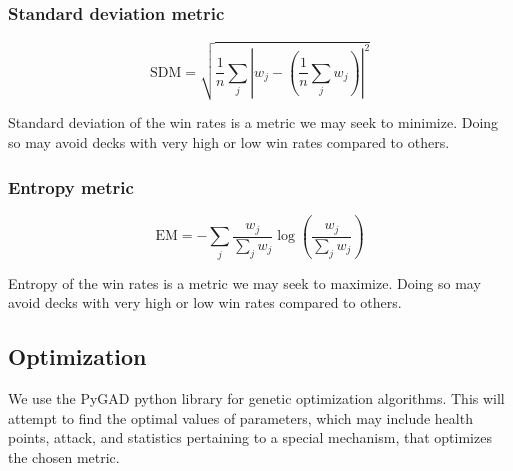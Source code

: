 


\subsubsection{Standard deviation metric}

\begin{equation}
	\mathrm{SDM} = \sqrt{\frac{1}{n} \sum_j \left|w_j - \left(\frac{1}{n}\sum_j w_j\right)\right|^2}
\end{equation}

Standard deviation of the win rates is a metric we may seek to minimize. Doing so may avoid decks with
very high or low win rates compared to others.

\subsubsection{Entropy metric}

\begin{equation}
	\mathrm{EM} = -\sum_j \frac{w_j}{\sum_j w_j} \log\left(\frac{w_j}{\sum_j w_j}\right)
\end{equation}

Entropy of the win rates is a metric we may seek to maximize. Doing so may avoid decks with very high or
low win rates compared to others.

\subsection{Optimization}


We use the PyGAD python library for genetic optimization algorithms. This will attempt to find the optimal values of
parameters, which may include health points, attack, and statistics pertaining to a special mechanism, that optimizes
the chosen metric.

